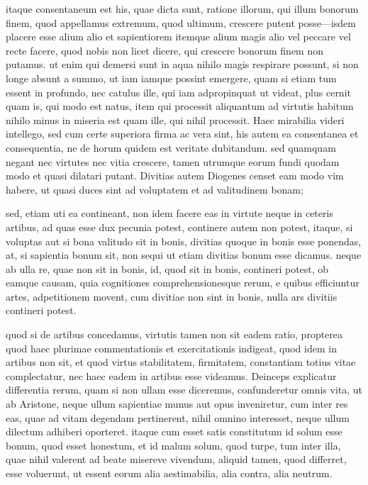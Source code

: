  itaque consentaneum est his, quae dicta sunt, ratione illorum, qui illum bonorum finem, quod appellamus extremum, quod ultimum, crescere putent posse—isdem placere esse alium alio et sapientiorem itemque alium magis alio vel peccare vel recte facere, quod nobis non licet dicere, qui crescere bonorum finem non putamus. ut enim qui demersi sunt in aqua nihilo magis respirare possunt, si non longe absunt a summo, ut iam iamque possint emergere, quam si etiam tum essent in profundo, nec catulus ille, qui iam adpropinquat ut videat, plus cernit quam is, qui modo est natus, item qui processit aliquantum ad virtutis habitum nihilo minus in miseria est quam ille, qui nihil processit. Haec mirabilia videri intellego, sed cum certe superiora firma ac vera sint, his autem ea consentanea et consequentia, ne de horum quidem est veritate dubitandum. sed quamquam negant nec virtutes nec vitia crescere, tamen utrumque eorum fundi quodam modo et quasi dilatari putant. Divitias autem Diogenes censet eam modo vim habere, ut quasi duces sint ad voluptatem et ad valitudinem bonam;

 sed, etiam uti ea contineant, non idem facere eas in virtute neque in ceteris artibus, ad quas esse dux pecunia potest, continere autem non potest, itaque, si voluptas aut si bona valitudo sit in bonis, divitias quoque in bonis esse ponendas, at, si sapientia bonum sit, non sequi ut etiam divitias bonum esse dicamus. neque ab ulla re, quae non sit in bonis, id, quod sit in bonis, contineri potest, ob eamque causam, quia cognitiones comprehensionesque rerum, e quibus efficiuntur artes, adpetitionem movent, cum divitiae non sint in bonis, nulla ars divitiis contineri potest.

 quod si de artibus concedamus, virtutis tamen non sit eadem ratio, propterea quod haec plurimae commentationis et exercitationis indigeat, quod idem in artibus non sit, et quod virtus stabilitatem, firmitatem, constantiam totius vitae complectatur, nec haec eadem in artibus esse videamus. Deinceps explicatur differentia rerum, quam si non ullam esse diceremus, confunderetur omnis vita, ut ab Aristone, neque ullum sapientiae munus aut opus inveniretur, cum inter res eas, quae ad vitam degendam pertinerent, nihil omnino interesset, neque ullum dilectum adhiberi oporteret. itaque cum esset satis constitutum id solum esse bonum, quod esset honestum, et id malum solum, quod turpe, tum inter illa, quae nihil valerent ad beate misereve vivendum, aliquid tamen, quod differret, esse voluerunt, ut essent eorum alia aestimabilia, alia contra, alia neutrum.


